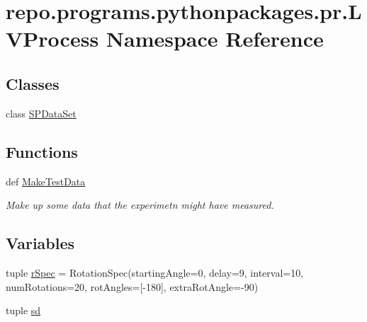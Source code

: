 \hypertarget{namespacerepo_1_1programs_1_1pythonpackages_1_1pr_1_1LVProcess}{\section{repo.\-programs.\-pythonpackages.\-pr.\-L\-V\-Process Namespace Reference}
\label{namespacerepo_1_1programs_1_1pythonpackages_1_1pr_1_1LVProcess}
}
\subsection*{Classes}
\begin{DoxyCompactItemize}
\item 
class \hyperlink{classrepo_1_1programs_1_1pythonpackages_1_1pr_1_1LVProcess_1_1SPDataSet}{S\-P\-Data\-Set}
\end{DoxyCompactItemize}
\subsection*{Functions}
\begin{DoxyCompactItemize}
\item 
def \hyperlink{namespacerepo_1_1programs_1_1pythonpackages_1_1pr_1_1LVProcess_a543482946297257ed0bb421f40e64f05}{Make\-Test\-Data}
\begin{DoxyCompactList}\small\item\em Make up some data that the experimetn {\itshape might} have measured. \end{DoxyCompactList}\end{DoxyCompactItemize}
\subsection*{Variables}
\begin{DoxyCompactItemize}
\item 
tuple \hyperlink{namespacerepo_1_1programs_1_1pythonpackages_1_1pr_1_1LVProcess_a79e153708bc016c970b43165bc080e87}{r\-Spec} = Rotation\-Spec(starting\-Angle=0, delay=9, interval=10, num\-Rotations=20, rot\-Angles=\mbox{[}-\/180\mbox{]}, extra\-Rot\-Angle=-\/90)
\item 
tuple \hyperlink{namespacerepo_1_1programs_1_1pythonpackages_1_1pr_1_1LVProcess_a14a936929069fcd8b4decd4743803799}{sd}
\end{DoxyCompactItemize}


